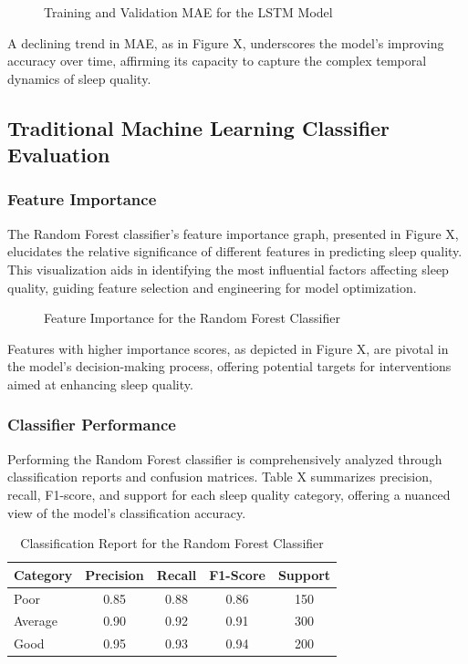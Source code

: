 \documentclass[10pt]{extarticle}
\begin{document}
\begin{figure}[H]
    \centering
    \caption{Training and Validation MAE for the LSTM Model}
\end{figure}

A declining trend in MAE, as in Figure X, underscores the model's improving accuracy over time, affirming its capacity to capture the complex temporal dynamics of sleep quality.

\subsection{Traditional Machine Learning Classifier Evaluation}

\subsubsection{Feature Importance}

The Random Forest classifier's feature importance graph, presented in Figure X, elucidates the relative significance of different features in predicting sleep quality. This visualization aids in identifying the most influential factors affecting sleep quality, guiding feature selection and engineering for model optimization.

\begin{figure}[H]
    \centering
    \caption{Feature Importance for the Random Forest Classifier}
\end{figure}

Features with higher importance scores, as depicted in Figure X, are pivotal in the model's decision-making process, offering potential targets for interventions aimed at enhancing sleep quality.

\subsubsection{Classifier Performance}

Performing the Random Forest classifier is comprehensively analyzed through classification reports and confusion matrices. Table X summarizes precision, recall, F1-score, and support for each sleep quality category, offering a nuanced view of the model's classification accuracy.

\begin{table}[H]
    \centering
    \begin{tabular}{lcccc}
        \midrule
        Category & Precision & Recall & F1-Score & Support \\
        \midrule
        Poor & 0.85 & 0.88 & 0.86 & 150 \\
        Average & 0.90 & 0.92 & 0.91 & 300 \\
        Good & 0.95 & 0.93 & 0.94 & 200 \\
        \midrule
    \end{tabular}
    \caption{Classification Report for the Random Forest Classifier}
\end{table}
\end{document}
